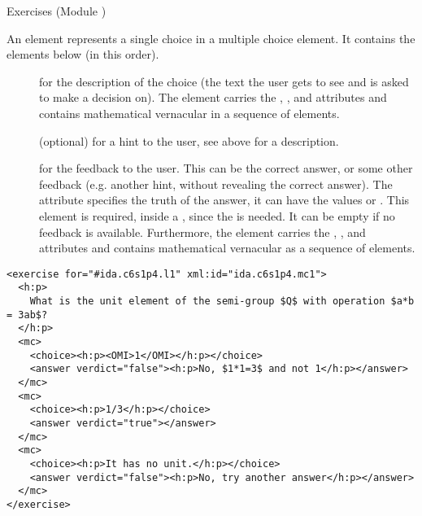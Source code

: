 \begin{module}[id=quiz]
\begin{omgroup}[id=quiz,short=Exercises]{Exercises (Module {})}
\begin{definition}[id=mc.def] 
  An {} element represents a single choice in a multiple choice element. It
  contains the elements below (in this order).
\begin{description}
\item[{}] for the description of the choice (the text the user gets to see
  and is asked to make a decision on). The {} element carries the
  {}, {}, and
  {} attributes and contains mathematical vernacular in a sequence
  of {} elements.
\item[{}] (optional) for a hint to the user, see above for a description.
\item[{}] for the feedback to the user. This can be the correct answer, or
  some other feedback (e.g. another hint, without revealing the correct answer).  The
  {} attribute specifies the truth of the answer, it can have
  the values {} or {}. This
  element is required, inside a {}, since the {} is
  needed. It can be empty if no feedback is available. Furthermore, the {}
  element carries the {}, {}, and
  {} attributes and contains mathematical vernacular as a sequence
  of {} elements.
\end{description}
\end{definition}

\begin{lstlisting}[label=lst:exercise,mathescape,
  caption={A Multiple-Choice Exercise in {\omdoc}},
  index={exercise,mc,choice,answer}]
<exercise for="#ida.c6s1p4.l1" xml:id="ida.c6s1p4.mc1">
  <h:p>
    What is the unit element of the semi-group $Q$ with operation $a*b = 3ab$?
  </h:p> 
  <mc>
    <choice><h:p><OMI>1</OMI></h:p></choice>
    <answer verdict="false"><h:p>No, $1*1=3$ and not 1</h:p></answer>
  </mc>
  <mc>
    <choice><h:p>1/3</h:p></choice>
    <answer verdict="true"></answer>
  </mc>
  <mc>
    <choice><h:p>It has no unit.</h:p></choice>
    <answer verdict="false"><h:p>No, try another answer</h:p></answer>
  </mc>
</exercise>
\end{lstlisting}
\end{omgroup}
\end{module}


